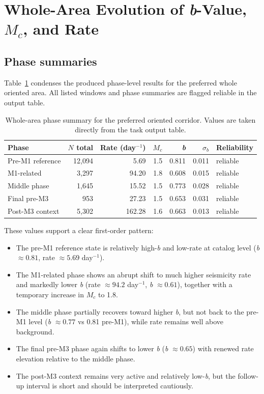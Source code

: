 \documentclass[11pt]{article}
\begin{document}
\section{Whole-Area Evolution of \textit{b}-Value, $M_c$, and Rate}
\subsection{Phase summaries}
Table~\ref{tab:phase-summary} condenses the produced phase-level results for the preferred whole oriented area. All listed windows and phase summaries are flagged reliable in the output table.

\begin{table}[H]
\centering
\caption{Whole-area phase summary for the preferred oriented corridor. Values are taken directly from the task output table.}
\label{tab:phase-summary}
\begin{tabularx}{\textwidth}{l r r r r r l}
\toprule
Phase & $N$ total & Rate (day$^{-1}$) & $M_c$ & \textit{b} & $\sigma_b$ & Reliability\\
\midrule
Pre-M1 reference & 12,094 & 5.69 & 1.5 & 0.811 & 0.011 & reliable\\
M1-related & 3,297 & 94.20 & 1.8 & 0.608 & 0.015 & reliable\\
Middle phase & 1,645 & 15.52 & 1.5 & 0.773 & 0.028 & reliable\\
Final pre-M3 & 953 & 27.23 & 1.5 & 0.653 & 0.031 & reliable\\
Post-M3 context & 5,302 & 162.28 & 1.6 & 0.663 & 0.013 & reliable\\
\bottomrule
\end{tabularx}
\end{table}

These values support a clear first-order pattern:
\begin{itemize}
    \item The pre-M1 reference state is relatively high-\textit{b} and low-rate at catalog level (\textit{b} $\approx 0.81$, rate $\approx 5.69$ day$^{-1}$).
    \item The M1-related phase shows an abrupt shift to much higher seismicity rate and markedly lower \textit{b} (rate $\approx 94.2$ day$^{-1}$, \textit{b} $\approx 0.61$), together with a temporary increase in $M_c$ to 1.8.
    \item The middle phase partially recovers toward higher \textit{b}, but not back to the pre-M1 level (\textit{b} $\approx 0.77$ vs 0.81 pre-M1), while rate remains well above background.
    \item The final pre-M3 phase again shifts to lower \textit{b} (\textit{b} $\approx 0.65$) with renewed rate elevation relative to the middle phase.
    \item The post-M3 context remains very active and relatively low-\textit{b}, but the follow-up interval is short and should be interpreted cautiously.
\end{itemize}
\end{document}
